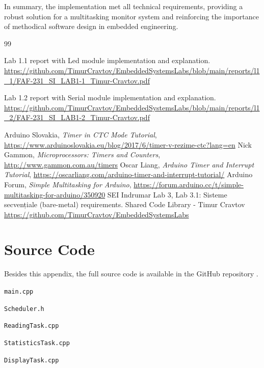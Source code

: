 In summary, the implementation met all technical requirements, providing a robust solution for a multitasking monitor system and reinforcing the importance of methodical software design in embedded engineering.


\begin{thebibliography}{99}

 Lab 1.1 report with Led module implementation and explanation. \url{https://github.com/TimurCravtov/EmbeddedSystemsLabs/blob/main/reports/l1_1/FAF-231_SI_LAB1-1_Timur-Cravtov.pdf}

 Lab 1.2 report with Serial module implementation and explanation. \url{https://github.com/TimurCravtov/EmbeddedSystemsLabs/blob/main/reports/l1_2/FAF-231_SI_LAB1-2_Timur-Cravtov.pdf}

 Arduino Slovakia, \textit{Timer in CTC Mode Tutorial}, \url{https://www.arduinoslovakia.eu/blog/2017/6/timer-v-rezime-ctc?lang=en}
 Nick Gammon, \textit{Microprocessors: Timers and Counters}, \url{http://www.gammon.com.au/timers}
 Oscar Liang, \textit{Arduino Timer and Interrupt Tutorial}, \url{https://oscarliang.com/arduino-timer-and-interrupt-tutorial/}
 Arduino Forum, \textit{Simple Multitasking for Arduino}, \url{https://forum.arduino.cc/t/simple-multitasking-for-arduino/350920}
 SEI Indrumar Lab 3, Lab 3.1: Sisteme secvențiale (bare-metal) requirements.
 Shared Code Library - Timur Cravtov \url{https://github.com/TimurCravtov/EmbeddedSystemsLabs}
\end{thebibliography}

\appendix

\section{Source Code}

Besides this appendix, the full source code is available in the GitHub repository \cite{github}.

\texttt{main.cpp}


\texttt{Scheduler.h}


\texttt{ReadingTask.cpp}


\texttt{StatisticsTask.cpp}


\texttt{DisplayTask.cpp}
